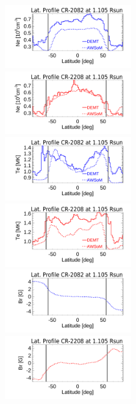 \documentclass[namedreferences]{solarphysics}
\begin{document}
\begin{article}
\begin{figure}[h!]
\begin{center}
\includegraphics[width=0.495\textwidth]{Perfil_Ne_demt_awsom_2082_1105_2.pdf}
\includegraphics[width=0.495\textwidth]{Perfil_Ne_demt_awsom_2208_multistart2_1105.pdf}
\includegraphics[width=0.495\textwidth]{Perfil_Te_demt_awsom_2082_1105_2.pdf}
\includegraphics[width=0.495\textwidth]{Perfil_Te_demt_awsom_2208_multistart2_1105.pdf}
\includegraphics[width=0.495\textwidth]{Perfil_Br_2082_1105_2.pdf}
\includegraphics[width=0.495\textwidth]{Perfil_Br_2208_1105_2.pdf}

\end{center}
\end{figure}
\end{article}
\end{document}
